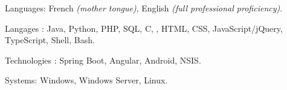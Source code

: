 \begin{indentsection}{\parindent}
\begin{description*}
  \item[Languages:]
  French \emph{(mother tongue)}, English \emph{(full professional proficiency)}.
 \item[Langages :] Java, Python, PHP, SQL, C, \Csharp, HTML,
  CSS, JavaScript/jQuery, TypeScript, Shell, Bash.
  \item[Technologies :] Spring Boot, Angular, Android, NSIS.
  \item[Systems:] Windows, Windows Server, Linux.
\end{description*}
\end{indentsection}
